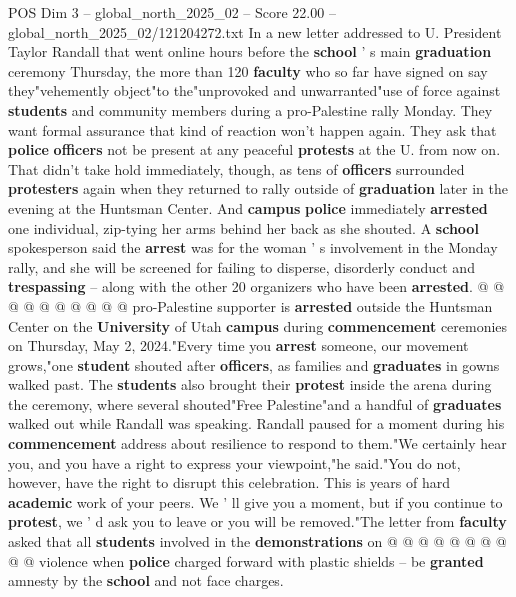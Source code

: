 \begin{textsample}{POS Dim 3 – global\_north\_2025\_02 – Score 22.00 – global\_north\_2025\_02/121204272.txt}  \label{ex:f3_pos_280}
In a new letter addressed to U.
President Taylor Randall that went online hours before the \textbf{school} ' s main \textbf{graduation} ceremony Thursday, the more than 120 \textbf{faculty} who so far have signed on say they"vehemently object"to the"unprovoked and unwarranted"use of force against \textbf{students} and community members during a pro-Palestine rally Monday.
They want formal assurance that kind of reaction won't happen again.
They ask that \textbf{police} \textbf{officers} not be present at any peaceful \textbf{protests} at the U. from now on.
That didn't take hold immediately, though, as tens of \textbf{officers} surrounded \textbf{protesters} again when they returned to rally outside of \textbf{graduation} later in the evening at the Huntsman Center.
And \textbf{campus} \textbf{police} immediately \textbf{arrested} one individual, zip-tying her arms behind her back as she shouted.
A \textbf{school} spokesperson said the \textbf{arrest} was for the woman ' s involvement in the Monday rally, and she will be screened for failing to disperse, disorderly conduct and \textbf{trespassing} -- along with the other 20 organizers who have been \textbf{arrested}. @ @ @ @ @ @ @ @ @ @ pro-Palestine supporter is \textbf{arrested} outside the Huntsman Center on the \textbf{University} of Utah \textbf{campus} during \textbf{commencement} ceremonies on Thursday, May 2, 2024."Every time you \textbf{arrest} someone, our movement grows,"one \textbf{student} shouted after \textbf{officers}, as families and \textbf{graduates} in gowns walked past.
The \textbf{students} also brought their \textbf{protest} inside the arena during the ceremony, where several shouted"Free Palestine"and a handful of \textbf{graduates} walked out while Randall was speaking.
Randall paused for a moment during his \textbf{commencement} address about resilience to respond to them."We certainly hear you, and you have a right to express your viewpoint,"he said."You do not, however, have the right to disrupt this celebration.
This is years of hard \textbf{academic} work of your peers.
We ' ll give you a moment, but if you continue to \textbf{protest}, we ' d ask you to leave or you will be removed."The letter from \textbf{faculty} asked that all \textbf{students} involved in the \textbf{demonstrations} on @ @ @ @ @ @ @ @ @ @ violence when \textbf{police} charged forward with plastic shields -- be \textbf{granted} amnesty by the \textbf{school} and not face charges.

\end{textsample}
